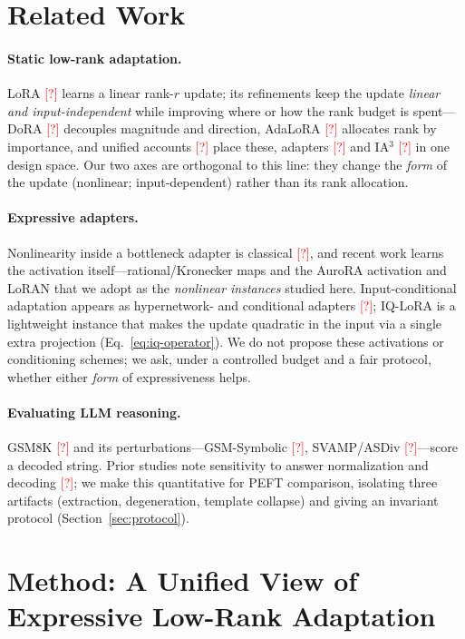 \documentclass[preprint,11pt]{elsarticle}
\newcommand{\todocite}{\textcolor{red}{[?]}}
\begin{document}
\section{Related Work}
\paragraph{Static low-rank adaptation.} LoRA \todocite{} learns a linear rank-$r$ update; its refinements keep the update
\emph{linear and input-independent} while improving where or how the rank budget is spent---DoRA \todocite{} decouples
magnitude and direction, AdaLoRA \todocite{} allocates rank by importance, and unified accounts \todocite{} place these,
adapters \todocite{} and IA$^3$ \todocite{} in one design space. Our two axes are orthogonal to this line: they change the
\emph{form} of the update (nonlinear; input-dependent) rather than its rank allocation.

\paragraph{Expressive adapters.} Nonlinearity inside a bottleneck adapter is classical \todocite{}, and recent work learns
the activation itself---rational/Kronecker maps and the AuroRA activation \citep{aurora} and LoRAN \citep{loran} that we
adopt as the \emph{nonlinear instances} studied here. Input-conditional adaptation appears as hypernetwork- and
conditional adapters \todocite{}; IQ-LoRA is a lightweight instance that makes the update quadratic in the input via a
single extra projection (Eq.~\ref{eq:iq-operator}). We do not propose these activations or conditioning schemes; we ask,
under a controlled budget and a fair protocol, whether either \emph{form} of expressiveness helps.

\paragraph{Evaluating LLM reasoning.} GSM8K \todocite{} and its perturbations---GSM-Symbolic \todocite{}, SVAMP/ASDiv
\todocite{}---score a decoded string. Prior studies note sensitivity to answer normalization and decoding \todocite{};
we make this quantitative for PEFT comparison, isolating three artifacts (extraction, degeneration, template collapse) and
giving an invariant protocol (Section~\ref{sec:protocol}).

\section{Method: A Unified View of Expressive Low-Rank Adaptation}
\label{sec:method}
\end{document}
